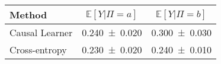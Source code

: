 \begin{tabular}{ lcc }
	\toprule Method
	&  $\mathbb{E}[Y| \Pi=a ]$
	&  $\mathbb{E}[Y| \Pi=b ]$
	\\ \midrule Causal Learner
	&  \SI{0.240\pm 0.020}{}
	&  \SI{0.300\pm 0.030}{}
	\\  Cross-entropy
	&  \SI{0.230\pm 0.020}{}
	&  \SI{0.240\pm 0.010}{}
	\\ \bottomrule\end{tabular}